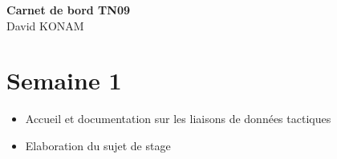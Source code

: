 \documentclass[11pt,fleqn]{book}
\begin{document}
\begingroup
\thispagestyle{empty}
\centering
\vspace*{5cm}
\par\normalfont\fontsize{35}{35}\sffamily\selectfont
\vspace*{2cm}
\textbf{Carnet de bord TN09}\
~\\
{\Huge David KONAM}\par %
\endgroup
{} %
							\pagestyle{empty} %
							\tableofcontents %
							\pagestyle{fancy} %
								\chapter{Semaine 1}
\begin{itemize}
\item Accueil  et  documentation  sur  les  liaisons  de  données  tactiques
\item Elaboration  du  sujet  de  stage
\end{itemize}
~\\
\end{document}
